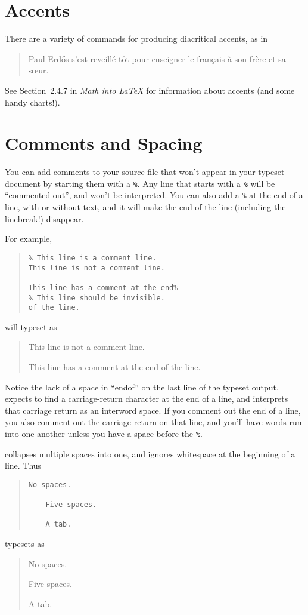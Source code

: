 \section{Accents}

There are a variety of commands for producing diacritical accents, as in
\begin{quote}
  Paul Erd\H{o}s s'est reveill\'{e} t\^{o}t pour enseigner le
  fran\c{c}ais \`{a} son fr\`{e}re et sa s\oe{}ur.
\end{quote}

See Section~2.4.7 in \emph{Math into \LaTeX} \citep{gratzer-mil} for
information about accents (and some handy charts!).


\section{Comments and Spacing}

You can add comments to your source file that won't appear in your
typeset document by starting them with a \verb+%+.  Any line that
starts with a \verb+%+ will be ``commented out'', and won't be
interpreted.  You can also add a \verb+%+ at the end of a line, with
or without text, and it will make the end of the line (including the
linebreak!) disappear.

For example,
\begin{quote}
\begin{verbatim}
% This line is a comment line.
This line is not a comment line.

This line has a comment at the end%
% This line should be invisible.
of the line.
\end{verbatim}
\end{quote}
will typeset as
\begin{quote}
This line is not a comment line.

This line has a comment at the end%
of the line.
\end{quote}

Notice the lack of a space in ``endof'' on the last line of the
typeset output.  \tex expects to find  a carriage-return character at the end
of a line, and interprets that carriage return as an interword space.
If you comment out the end of a line, you also comment out the
carriage return on that line, and you'll have words run into one
another unless you have a space before the \verb+%+.

\tex collapses multiple spaces into one, and ignores whitespace at the
beginning of a line.  Thus
\begin{quote}
\begin{verbatim}
No spaces.

    Five spaces.

    A tab.
\end{verbatim}
\end{quote}
typesets as
\begin{quote}
No spaces.

    Five spaces.

    A tab.
\end{quote}

